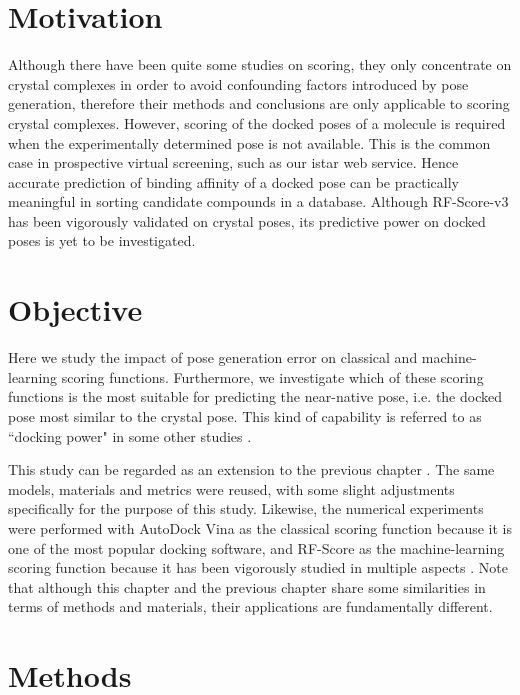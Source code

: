 \section{Motivation}

Although there have been quite some studies \citep{1432,1647,1433} on scoring, they only concentrate on crystal complexes in order to avoid confounding factors introduced by pose generation, therefore their methods and conclusions are only applicable to scoring crystal complexes. However, scoring of the docked poses of a molecule is required when the experimentally determined pose is not available. This is the common case in prospective virtual screening, such as our istar web service. Hence accurate prediction of binding affinity of a docked pose can be practically meaningful in sorting candidate compounds in a database. Although RF-Score-v3 has been vigorously validated on crystal poses, its predictive power on docked poses is yet to be investigated.

\section{Objective}

Here we study the impact of pose generation error on classical and machine-learning scoring functions. Furthermore, we investigate which of these scoring functions is the most suitable for predicting the near-native pose, i.e. the docked pose most similar to the crystal pose. This kind of capability is referred to as ``docking power" in some other studies \citep{1411}.

This study can be regarded as an extension to the previous chapter \citep{1647,1433}. The same models, materials and metrics were reused, with some slight adjustments specifically for the purpose of this study. Likewise, the numerical experiments were performed with AutoDock Vina \citep{595} as the classical scoring function because it is one of the most popular docking software, and RF-Score \citep{564} as the machine-learning scoring function because it has been vigorously studied in multiple aspects \citep{1281,1362,1370}. Note that although this chapter and the previous chapter share some similarities in terms of methods and materials, their applications are fundamentally different.

\section{Methods}

